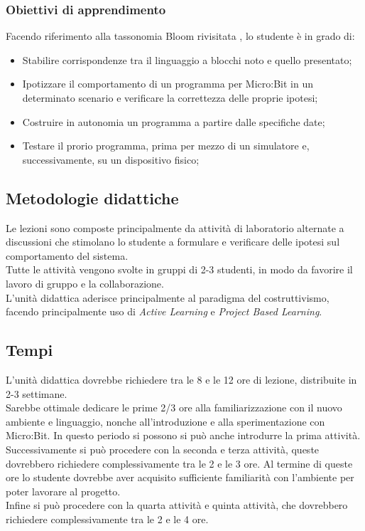 \documentclass[../../relazione.tex]{subfiles}
\begin{document}
\subsubsection{Obiettivi di apprendimento}
Facendo riferimento alla tassonomia Bloom rivisitata \cite{BLOOM}, lo studente è in grado di:
\begin{itemize}
	\item Stabilire corrispondenze tra il linguaggio a blocchi noto e quello presentato;
	\item Ipotizzare il comportamento di un programma per Micro:Bit in un determinato scenario e verificare la correttezza delle proprie ipotesi;
	\item Costruire in autonomia un programma a partire dalle specifiche date;
	\item Testare il prorio programma, prima per mezzo di un simulatore e, successivamente, su un dispositivo fisico;
\end{itemize}

\subsection{Metodologie didattiche}

Le lezioni sono composte principalmente da attività di laboratorio alternate a discussioni che stimolano lo studente a formulare e verificare delle ipotesi sul comportamento del sistema.\\
Tutte le attività vengono svolte in gruppi di 2-3 studenti, in modo da favorire il lavoro di gruppo e la collaborazione.\\
L'unità didattica aderisce principalmente al paradigma del costruttivismo, facendo principalmente uso di \textit{Active Learning} e \textit{Project Based Learning}.

\subsection{Tempi}
L'unità didattica dovrebbe richiedere tra le 8 e le 12 ore di lezione, distribuite in 2-3 settimane.\\
Sarebbe ottimale dedicare le prime 2/3 ore alla familiarizzazione con il nuovo ambiente e linguaggio, nonche all'introduzione e alla sperimentazione con Micro:Bit. In questo periodo si possono si può anche introdurre la prima attività.\\
Successivamente si può procedere con la seconda e terza attività, queste dovrebbero richiedere complessivamente tra le 2 e le 3 ore. Al termine di queste ore lo studente dovrebbe aver acquisito sufficiente familiarità con l'ambiente per poter lavorare al progetto.\\
Infine si può procedere con la quarta attività e quinta attività, che dovrebbero richiedere complessivamente tra le 2 e le 4 ore. 
\end{document}
